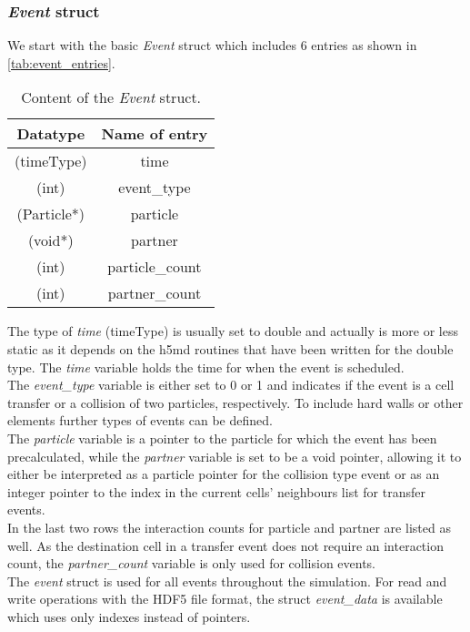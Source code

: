 \subsubsection{\textit{Event} struct}
\label{sec:event_struct}
We start with the basic \textit{Event} struct which includes 6 entries as shown in \autoref{tab:event_entries}.
\begin{table}[h!]
\centering
\begin{tabular}{c|c}
\textbf{Datatype} & \textbf{Name of entry}\\ \hline
(timeType) & time \\
(int) & event\_type \\
(Particle*)  & particle \\
(void*) & partner \\
(int) & particle\_count \\
(int) & partner\_count \\
\end{tabular}
\caption[\textit{Event} struct content]{Content of the \textit{Event} struct.}
\label{tab:event_entries}
\end{table}
The type of \textit{time} (timeType) is usually set to double and actually is more or less static as it depends on the h5md routines that have been written for the double type. The \textit{time} variable holds the time for when the event is scheduled.\\ 
The \textit{event\_type} variable is either set to 0 or 1 and indicates if the event is a cell transfer or a collision of two particles, respectively. To include hard walls or other elements further types of events can be defined.\\
The \textit{particle} variable is a pointer to the particle for which the event has been precalculated, while the \textit{partner} variable is set to be a void pointer, allowing it to either be interpreted as a particle pointer for the collision type event or as an integer pointer to the index in the current cells' neighbours list for transfer events.\\
In the last two rows the interaction counts for particle and partner are listed as well. As the destination cell in a transfer event does not require an interaction count, the \textit{partner\_count} variable is only used for collision events.\\

The \textit{event} struct is used for all events throughout the simulation. For read and write operations with the HDF5 file format, the struct \textit{event\_data} is available which uses only indexes instead of pointers.\\

